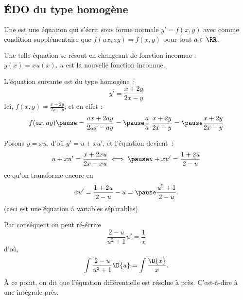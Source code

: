 \subsection{ÉDO du type homogène}
\begin{frame}
  \begin{definition}
    Une \pause{} est une équation qui s'écrit sous forme normale \(y' = f(x,y)\)\pause{} avec comme condition supplémentaire que \(f(ax,ay) = f(x,y)\) pour tout \(a \in \RR\).\pause{}
  \end{definition}

  Une telle équation se résout en changeant de fonction inconnue : \(y(x) = x u(x)\).\pause{} \(u\) est la nouvelle fonction inconnue.
\end{frame}
\begin{frame}
  \begin{example}
    L'équation suivante est du type homogène~:\pause{}
    \begin{equation*}
      y' = \frac{x + 2y}{2x - y}
    \end{equation*}\pause{}
    Ici, \(f(x,y) = \frac{x + 2y}{2x - y}\)\pause{}, et en effet :
    \begin{equation*}
      f(ax,ay)\pause = \frac{ax + 2ay}{2ax - ay} =\pause \frac{a}{a} \; \frac{x + 2y}{2x - y} =\pause \frac{x + 2y}{2x - y}
    \end{equation*}\pause{}
    
    Posons \(y = xu\)\pause{}, d'où \(y' = u + x u'\),\pause{} et l'équation devient~:\pause{}
    \begin{equation*}
      u + x u' = \frac{x + 2xu}{2x - xu} \iff \pause u + x u' = \frac{1 + 2u}{2 - u}
    \end{equation*}\pause{}
    ce qu'on transforme encore en\pause{}
    \begin{equation*}
      x u' = \frac{1 + 2u}{2 - u} - u =\pause \frac{u^{2}+1}{2-u}.
    \end{equation*}\pause{}
    (ceci est une équation à variables séparables)
  \end{example}
\end{frame}
\begin{frame}
  \begin{example}Par conséquent on peut ré-écrire\pause{}
    \begin{equation*}
      \frac{2-u}{u^{2}+1}u' = \frac{1}{x}
    \end{equation*}\pause{}
    d'où,\pause{}
    \begin{equation*}
      \int \frac{2-u}{u^{2}+1}\D{u} = \int \frac{\D{x}}{x}.
    \end{equation*}\pause
    À ce point, on dit que l'équation différentielle est résolue à  près. \pause{}C'est-à-dire à une intégrale près.
  \end{example}
\end{frame}

